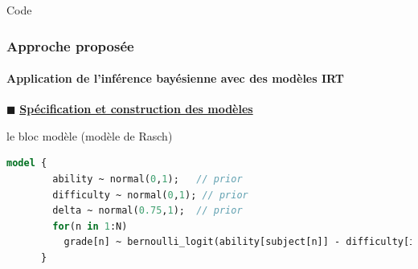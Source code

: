 \documentclass[aspectratio=169,professionalfonts, 12pt]{beamer}
\begin{document}
\begin{frame}[fragile]{Code}
  \frametitle{Approche proposée}
  \framesubtitle{Application de l'inférence bayésienne avec des modèles IRT}
  \justifying 
  \(\displaystyle \blacksquare \) \textbf{\underline{Spécification et construction des modèles}}
  \begin{minipage}{\textwidth}
  \begin{block}{le bloc modèle (modèle de Rasch)}
    \begin{lstlisting}[language=Stan,basicstyle=\scriptsize,framesep=4.5mm,framexleftmargin=2.5mm,tabsize=2]
      model {
        ability ~ normal(0,1);   // prior      
        difficulty ~ normal(0,1); // prior   
        delta ~ normal(0.75,1);  // prior 
        for(n in 1:N)
          grade[n] ~ bernoulli_logit(ability[subject[n]] - difficulty[item[n]] + delta);
      }
    \end{lstlisting}
  \end{block}
  \end{minipage}
\end{frame}

\end{document}
